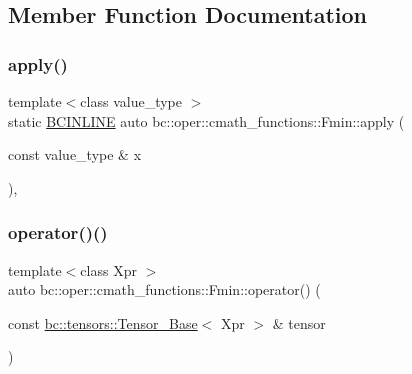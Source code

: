 \subsection{Member Function Documentation}
\mbox{\label{structbc_1_1oper_1_1cmath__functions_1_1Fmin_a73820f69aafe5a65c82036c81730de35}} 
\subsubsection{\texorpdfstring{apply()}{apply()}}
{\footnotesize\ttfamily template$<$class value\+\_\+type $>$ \\
static \hyperlink{common_8h_a6699e8b0449da5c0fafb878e59c1d4b1}{B\+C\+I\+N\+L\+I\+NE} auto bc\+::oper\+::cmath\+\_\+functions\+::\+Fmin\+::apply (\begin{DoxyParamCaption}\item[{const value\+\_\+type \&}]{x }\end{DoxyParamCaption})\hspace{0.3cm}{\ttfamily [inline]}, {\ttfamily [static]}}

\mbox{\label{structbc_1_1oper_1_1cmath__functions_1_1Fmin_a5e68a36c4e28a4a19b78cbe58c0e7fc4}} 
\subsubsection{\texorpdfstring{operator()()}{operator()()}\hspace{0.1cm}{\footnotesize\ttfamily [1/3]}}
{\footnotesize\ttfamily template$<$class Xpr $>$ \\
auto bc\+::oper\+::cmath\+\_\+functions\+::\+Fmin\+::operator() (\begin{DoxyParamCaption}\item[{const \hyperlink{classbc_1_1tensors_1_1Tensor__Base}{bc\+::tensors\+::\+Tensor\+\_\+\+Base}$<$ Xpr $>$ \&}]{tensor }\end{DoxyParamCaption})\hspace{0.3cm}{\ttfamily [inline]}}

